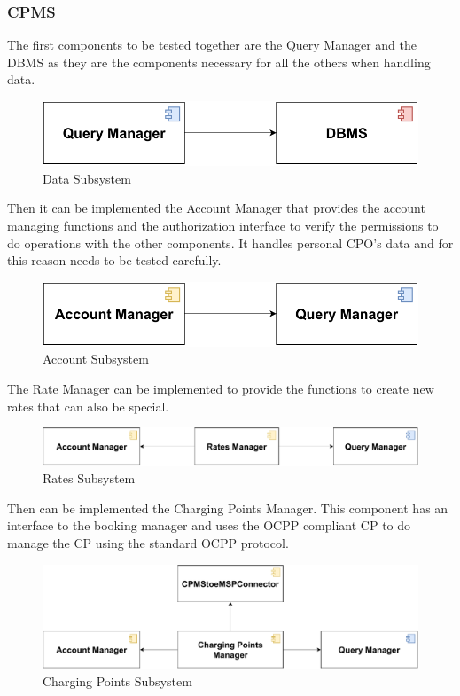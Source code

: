 \subsubsection{CPMS}
The first components to be tested together are the Query Manager and the DBMS as they are the
components necessary for all the others when handling data.
\begin{figure}[H]
    \centering
    \includegraphics[scale=0.6]{src/Integration/CPMS_Query.pdf}
    \caption{Data Subsystem}
\end{figure}
Then it can be implemented the Account Manager that provides the account managing functions and the authorization interface 
to verify the permissions to do operations with the other components. It handles personal CPO's data and for this reason needs
to be tested carefully.
\begin{figure}[H]
    \centering
    \includegraphics[scale=0.6]{src/Integration/CPMS_Account.pdf}
    \caption{Account Subsystem}
\end{figure}
The Rate Manager can be implemented to provide the functions to create new rates that can also be special.
\begin{figure}[H]
    \centering
    \includegraphics[scale=0.6]{src/Integration/CPMS_Rates.pdf}
    \caption{Rates Subsystem}
\end{figure}
Then can be implemented the Charging Points Manager. This component has an interface to the booking manager and uses the OCPP compliant CP
to do manage the CP using the standard OCPP protocol.
\begin{figure}[H]
    \centering
    \includegraphics[scale=0.6]{src/Integration/CPMS_CPs.pdf}
    \caption{Charging Points Subsystem}
\end{figure}
